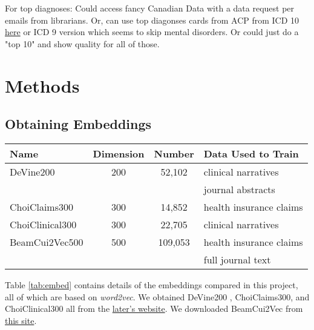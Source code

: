 \documentclass[10pt]{article}
\begin{document}
For top diagnoses: Could access fancy Canadian Data with a data request per emails from librarians. Or, can use top diagonses cards from ACP from ICD 10 \href{https://www.acponline.org/system/files/documents/running_practice/payment_coding/coding/icd10_coding_card.pdf}{here} or ICD 9 version which seems to skip mental disorders. Or could just do a "top 10" and show quality for all of those.


\section{Methods}

\subsection{Obtaining Embeddings}

\begin{table*}[h!]
	\begin{center}
		\caption{Charectoristics of the embeddings compared, including the name referred, the embedding dimensions, the number of embeddings in the dataset, and the type of data used to train them.}
		\label{tab:embed}
		\begin{tabular}{l|c|c|l} %
			\textbf{Name} & \textbf{Dimension} & \textbf{Number} & \textbf{Data Used to Train} \\
			\hline
			DeVine200 & 200 & 52,102 & clinical narratives\\
			&&&journal abstracts\\
			ChoiClaims300 & 300 & 14,852& health insurance claims\\
			ChoiClinical300 & 300 & 22,705& clinical narratives\\
			BeamCui2Vec500 & 500 & 109,053& health insurance claims\\
			&&&full journal text\\
		\end{tabular}
	\end{center}
\end{table*}

Table \ref{tab:embed} contains details of the embeddings compared in this project, all of which are based on \emph{word2vec}. We obtained DeVine200 \cite{devineMedicalSemanticSimilarity2014}, ChoiClaims300, and ChoiClinical300 \cite{choiLearningLowDimensionalRepresentations2016} all from the \href{https://github.com/clinicalml/embeddings}{later's website}. We downloaded BeamCui2Vec \cite{beamClinicalConceptEmbeddings2018} from \href{https://figshare.com/s/00d69861786cd0156d81}{this site}. 
\end{document}
